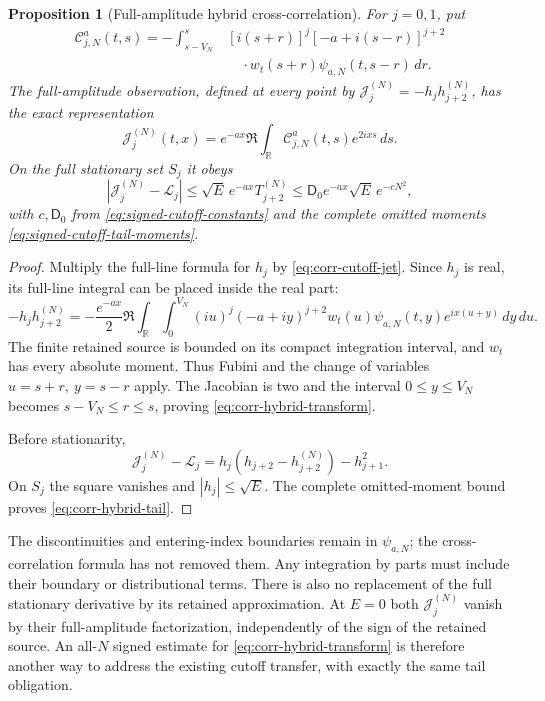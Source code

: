 \documentclass[11pt]{article}
\numberwithin{equation}{section}
\newtheorem{proposition}[theorem]{Proposition}
\theoremstyle{definition}
\theoremstyle{remark}
\newcommand{\R}{\mathbb R}
\newcommand{\dd}{\,d}
\newcommand{\Lag}{\mathcal L}
\begin{document}
\begin{proposition}[Full-amplitude hybrid cross-correlation]
\label{prop:corr-hybrid}
For \(j=0,1\), put
\begin{equation}
 \begin{split}
 \mathscr C_{j,N}^{a}(t,s)
 =-\int_{s-V_N}^{s}
 &[i(s+r)]^j[-a+i(s-r)]^{j+2}\\
 &\quad\cdot w_t(s+r)\psi_{a,N}(t,s-r)\dd r.
 \end{split}
 \label{eq:corr-hybrid-kernel}
\end{equation}
The full-amplitude observation, defined at every point by
\(\mathcal J_j^{(N)}=-h_jh_{j+2}^{(N)}\), has the exact representation
\begin{equation}
 \mathcal J_j^{(N)}(t,x)
   =e^{-ax}\Re\int_{\R}
          \mathscr C_{j,N}^{a}(t,s)e^{2ixs}\dd s.
 \label{eq:corr-hybrid-transform}
\end{equation}
On the full stationary set \(S_j\) it obeys
\begin{equation}
 \left|\mathcal J_j^{(N)}-\Lag_j\right|
 \le\sqrt E\,e^{-ax}T_{j+2}^{(N)}
 \le\mathsf D_0e^{-ax}\sqrt E\,e^{-cN^2},
 \label{eq:corr-hybrid-tail}
\end{equation}
with \(c,\mathsf D_0\) from \eqref{eq:signed-cutoff-constants}
and the complete omitted moments
\eqref{eq:signed-cutoff-tail-moments}.
\end{proposition}
\begin{proof}
Multiply the full-line formula for \(h_j\) by
\eqref{eq:corr-cutoff-jet}.  Since \(h_j\) is real, its full-line
integral can be placed inside the real part:
\[
 -h_jh_{j+2}^{(N)}
 =-\frac{e^{-ax}}2\Re\int_{\R}\int_0^{V_N}
       (iu)^j(-a+iy)^{j+2}
       w_t(u)\psi_{a,N}(t,y)e^{ix(u+y)}\dd y\dd u.
\]
The finite retained source is bounded on its compact integration
interval, and \(w_t\) has every absolute moment.  Thus Fubini and
the change of variables \(u=s+r,\ y=s-r\) apply.  The Jacobian is
two and the interval \(0\le y\le V_N\) becomes
\(s-V_N\le r\le s\), proving
\eqref{eq:corr-hybrid-transform}.

Before stationarity,
\[
 \mathcal J_j^{(N)}-\Lag_j
   =h_j(h_{j+2}-h_{j+2}^{(N)})-h_{j+1}^2.
\]
On \(S_j\) the square vanishes and \(|h_j|\le\sqrt E\).
The complete omitted-moment bound proves
\eqref{eq:corr-hybrid-tail}.
\end{proof}

The discontinuities and entering-index boundaries remain in
\(\psi_{a,N}\); the cross-correlation formula has not removed them.
Any integration by parts must include their boundary or distributional
terms.  There is also no replacement of the full stationary derivative
by its retained approximation.  At \(E=0\) both
\(\mathcal J_j^{(N)}\) vanish by their full-amplitude factorization,
independently of the sign of the retained source.
An all-\(N\) signed estimate for
\eqref{eq:corr-hybrid-transform} is therefore another way to address
the existing cutoff transfer, with exactly the same tail obligation.
\end{document}
